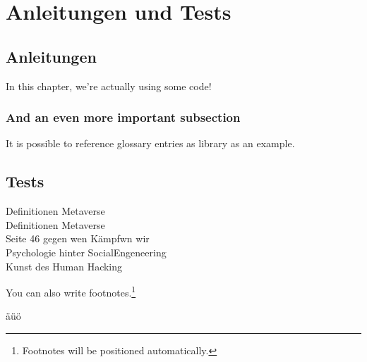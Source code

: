 \chapter{Anleitungen und Tests}\label{ch:Anleitungen}

\section{Anleitungen}
In this chapter, we're actually using some code!




%




\subsection{And an even more important subsection}

It is possible to reference glossary entries as \gls{library} as an example.

\section*{Tests}


Definitionen Metaverse \cite{Ball22}
\\Definitionen Metaverse \cite{Drip22} \\
Seite 46 gegen wen Kämpfwn wir \cite{Hypp22}\\
Psychologie hinter SocialEngeneering \cite{schu11}\\
Kunst des Human Hacking \cite{Hadn11}



You can also write footnotes.\footnote{Footnotes will be positioned automatically.}

äüö
